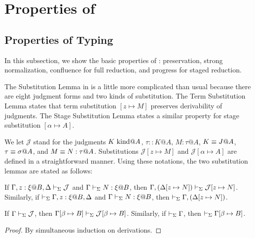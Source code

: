 
\section{Properties of \LMD \label{sec:properties}}

\subsection{Properties of Typing}

In this subsection, we show the basic properties of \LMD: preservation, strong
normalization, confluence for full reduction, and progress for staged
reduction.


The Substitution Lemma in \LMD{} is a little more complicated than usual because there are eight judgment forms and two kinds of substitution.  The Term Substitution Lemma states that term substitution $[z \mapsto M]$ preserves derivability of judgments. The Stage Substitution Lemma states a similar property for stage substitution $[\alpha\mapsto A]$.  

We let $\mathcal{J}$ stand for the judgments $K \text{\ kind} @A$, $\tau::K@A$,
$M:\tau@A$, $K \equiv J @ A$, $\tau \equiv \sigma @ A$, and
$M \equiv N : \tau @ A$.  Substitutions $\mathcal{J}[z \mapsto M]$ and
$\mathcal{J}[\alpha \mapsto A]$ are defined in a straightforward
manner.  Using these notations, the two substitution lemmas are stated as follows:

\begin{lemma}
    \label{lemma:TermSubstitution}
    If $\G, z:\xi@B, \D \V \mathcal{J}$ and $\Gamma\vdash_\Sigma N:\xi @B$, then $\Gamma, (\Delta[z \mapsto N]) \vdash_\Sigma \mathcal{J}[z \mapsto N]$.  Similarly, if $\V \G, z:\xi@B, \D$ and
    $\Gamma\vdash_\Sigma N:\xi @B$, then $\vdash_\Sigma \Gamma, (\Delta[z \mapsto N])$.
\end{lemma}

\begin{lemma}
    \label{lemma:StageSubstitution}
    If $\Gamma \vdash_\Sigma \mathcal{J}$, then $\Gamma[\beta\mapsto B] \vdash_\Sigma \mathcal{J}[\beta\mapsto B]$.  Similarly, if $\vdash_\Sigma \Gamma$, then $\vdash_\Sigma \Gamma[\beta\mapsto B]$.
\end{lemma}

\begin{proof}
    By simultaneous induction on derivations.
\end{proof}


